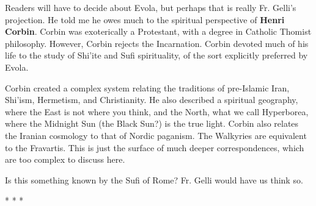 Readers will have to decide about Evola, but perhaps that is really Fr. Gelli's projection. He told me he owes much to the spiritual perspective of \textbf{Henri Corbin}. Corbin was exoterically a Protestant, with a degree in Catholic Thomist philosophy. However, Corbin rejects the Incarnation. Corbin devoted much of his life to the study of Shi'ite and Sufi spirituality, of the sort explicitly preferred by Evola.

Corbin created a complex system relating the traditions of pre-Islamic Iran, Shi'ism, Hermetism, and Christianity. He also described a spiritual geography, where the East is not where you think, and the North, what we call Hyperborea, where the Midnight Sun (the Black Sun?) is the true light. Corbin also relates the Iranian cosmology to that of Nordic paganism. The Walkyries are equivalent to the Fravartis. This is just the surface of much deeper correspondences, which are too complex to discuss here.

Is this something known by the Sufi of Rome? Fr. Gelli would have us think so.



\begin{center}* * *\end{center}

